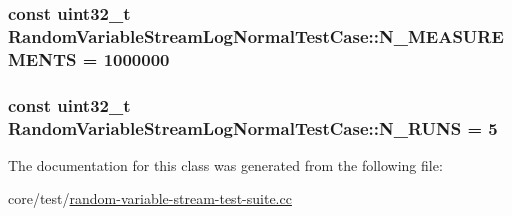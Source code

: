 \subsubsection[{\texorpdfstring{N\+\_\+\+M\+E\+A\+S\+U\+R\+E\+M\+E\+N\+TS}{N_MEASUREMENTS}}]{\setlength{\rightskip}{0pt plus 5cm}const uint32\+\_\+t Random\+Variable\+Stream\+Log\+Normal\+Test\+Case\+::\+N\+\_\+\+M\+E\+A\+S\+U\+R\+E\+M\+E\+N\+TS = 1000000\hspace{0.3cm}{\ttfamily [static]}}\hypertarget{classRandomVariableStreamLogNormalTestCase_a170a3082635604f00062bd8d4b0d7877}{}\label{classRandomVariableStreamLogNormalTestCase_a170a3082635604f00062bd8d4b0d7877}
\subsubsection[{\texorpdfstring{N\+\_\+\+R\+U\+NS}{N_RUNS}}]{\setlength{\rightskip}{0pt plus 5cm}const uint32\+\_\+t Random\+Variable\+Stream\+Log\+Normal\+Test\+Case\+::\+N\+\_\+\+R\+U\+NS = 5\hspace{0.3cm}{\ttfamily [static]}}\hypertarget{classRandomVariableStreamLogNormalTestCase_aa0ed975bc309cc017c914f56024fc147}{}\label{classRandomVariableStreamLogNormalTestCase_aa0ed975bc309cc017c914f56024fc147}


The documentation for this class was generated from the following file\+:\begin{DoxyCompactItemize}
\item 
core/test/\hyperlink{random-variable-stream-test-suite_8cc}{random-\/variable-\/stream-\/test-\/suite.\+cc}\end{DoxyCompactItemize}
